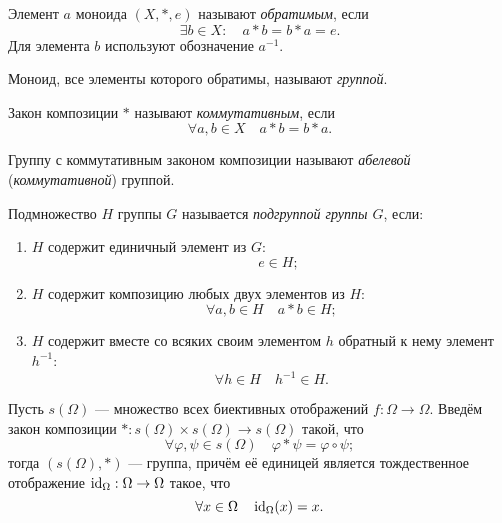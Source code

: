 \begin{definition}
  Элемент $a$ моноида $(X, *, e)$ называют \textit{обратимым}, если
  \begin{equation*}
    \exists b \in X: \quad a * b = b * a = e.
  \end{equation*}
  Для элемента $b$ используют обозначение $a^{-1}$.
\end{definition}

\begin{definition}
  Моноид, все элементы которого обратимы, называют \textit{группой}.
\end{definition}

\begin{definition}
  Закон композиции $*$ называют \textit{коммутативным}, если
  \begin{equation*}
    \forall a,b \in X \quad a * b = b * a.
  \end{equation*}
\end{definition}

\begin{definition}
  Группу с коммутативным законом композиции называют \textit{абелевой}
  (\textit{коммутативной}) группой.
\end{definition}

\begin{definition}
  Подмножество $H$ группы $G$ называется \textit{подгруппой группы $G$}, если:
  \begin{enumerate}
    \item $H$ содержит единичный элемент из $G$:
      \begin{equation*}
        \quad e \in H;
      \end{equation*}
    \item $H$ содержит композицию любых двух элементов из $H$:
      \begin{equation*}
        \forall a,b \in H \quad a * b \in H;
      \end{equation*}
    \item $H$ содержит вместе со всяких своим элементом $h$ обратный к нему
      элемент $h^{-1}$:
      \begin{equation*}
        \forall h \in H \quad h^{-1} \in H.
      \end{equation*}
  \end{enumerate}
\end{definition}

Пусть $s(\Omega)$ --- множество всех биективных отображений $f : \Omega \to
\Omega$. Введём закон композиции $* : s(\Omega) \times s(\Omega) \to s(\Omega)$
такой, что
\begin{equation*}
  \forall \varphi, \psi \in s(\Omega) \quad \varphi * \psi = \varphi \circ \psi;
\end{equation*}
тогда $(s(\Omega), *)$ --- группа, причём её единицей является тождественное
отображение $\operatorname{id}_\Omega: \Omega \to \Omega$ такое, что
\begin{equation*}
  \forall x \in \Omega \quad \operatorname{id}_\Omega(x) = x.
\end{equation*}

